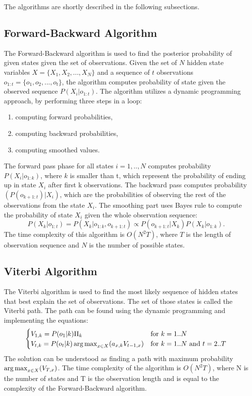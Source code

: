 The algorithms are shortly described in the following subsections.

\subsection{Forward-Backward Algorithm} 

The Forward-Backward algorithm is used to find the posterior probability of given states given the set of observations.
Given the set of $N$ hidden state variables $X = \{X_1, X_2, ..., X_N\}$ and a sequence of $t$ observations $o_{1:t} = \{o_1, o_2,...,o_t\}$, the algorithm computes probability of state given the observed sequence $P(X_i | o_{1:t})$.
The algorithm utilizes a dynamic programming approach, by performing three steps in a loop: 
\begin{enumerate}
\item computing forward probabilities,
\item computing backward probabilities,
\item computing smoothed values.
\end{enumerate}
The forward pass phase for all states $i=1,..,N$ computes probability $P(X_i | o_{1:k})$, where $k$ is smaller than t, which represent the probability of ending up in state $X_i$ after first k observations. 
The backward pass computes probability $(P(o_{k+1:t}) | X_i)$, which are the probabilities of observing the rest of the observations from the state $X_i$.
The smoothing part uses Bayes rule to compute the probability of state $X_i$ given the whole observation sequence:
\begin{equation}
P(X_k | o_{1:t}) = P(X_k | o_{1:k}, o_{k+1:t}) \propto P(o_{k+1:t} | X_k) P(X_k | o_{1:k}).
\end{equation}
The time complexity of this algorithm is $O(N^2 T)$, where $T$ is the length of observation sequence and $N$ is the number of possible states.


\subsection{Viterbi Algorithm}

The Viterbi algorithm is used to find the most likely sequence of hidden states that best explain the set of observations.
The set of those states is called the Viterbi path. 
The path can be found using the dynamic programming and implementing the equations:
\begin{equation}
\begin{cases} V_{1,k} = P(o_1 | k)  \Pi_k & \mbox{for } k = 1..N \\ V_{t,k} = P(o_t | k)  \operatorname*{arg\,max}_{x\in X} (a_{x,k}  V_{t-1,x}) & \mbox{for } k = 1..N\mbox{ and } t = 2..T \end{cases}
\end{equation}
The solution can be understood as finding a path with maximum probability $\operatorname*{arg\,max}_{x\in X} (V_{T,x})$. 
The time complexity of the algorithm is $O(N^2 T)$, where N is the number of states and T is the observation length and is equal to the complexity of the Forward-Backward algorithm.

